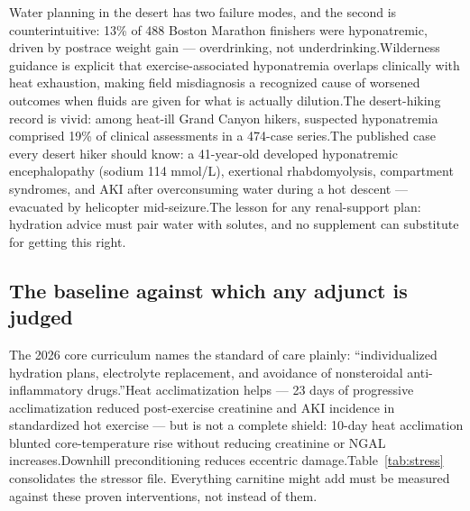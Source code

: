 \documentclass[11pt]{article}
\newcommand{\src}[1]{\allowbreak[#1]}
\begin{document}
Water planning in the desert has two failure modes, and the second is counterintuitive: 13\% of 488 Boston Marathon finishers were hyponatremic, driven by postrace weight gain --- overdrinking, not underdrinking.\src{189} Wilderness guidance is explicit that exercise-associated hyponatremia overlaps clinically with heat exhaustion, making field misdiagnosis a recognized cause of worsened outcomes when fluids are given for what is actually dilution.\src{190} The desert-hiking record is vivid: among heat-ill Grand Canyon hikers, suspected hyponatremia comprised 19\% of clinical assessments in a 474-case series.\src{192} The published case every desert hiker should know: a 41-year-old developed hyponatremic encephalopathy (sodium 114 mmol/L), exertional rhabdomyolysis, compartment syndromes, and AKI after overconsuming water during a hot descent --- evacuated by helicopter mid-seizure.\src{179} The lesson for any renal-support plan: hydration advice must pair water with solutes, and no supplement can substitute for getting this right.\src{190}\src{179}

\subsection{The baseline against which any adjunct is judged}

The 2026 core curriculum names the standard of care plainly: ``individualized hydration plans, electrolyte replacement, and avoidance of nonsteroidal anti-inflammatory drugs.''\src{175} Heat acclimatization helps --- 23 days of progressive acclimatization reduced post-exercise creatinine and AKI incidence in standardized hot exercise --- but is not a complete shield: 10-day heat acclimation blunted core-temperature rise without reducing creatinine or NGAL increases.\src{195}\src{194} Downhill preconditioning reduces eccentric damage.\src{180} Table~\ref{tab:stress} consolidates the stressor file. Everything carnitine might add must be measured against these proven interventions, not instead of them.
\end{document}
